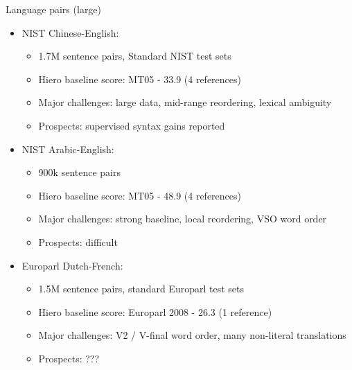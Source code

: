 \documentclass{beamer}
\begin{document}
\begin{frame}[t]{Language pairs (large)}
\begin{itemize}
\item NIST Chinese-English:
  \begin{itemize}
  \item 1.7M sentence pairs, Standard NIST test sets
  \item Hiero baseline score: MT05 - 33.9 (4 references)
  \item Major challenges: large data, mid-range reordering, lexical ambiguity
  \item Prospects: supervised syntax gains reported
  \end{itemize}
\item NIST Arabic-English:
  \begin{itemize}
  \item 900k sentence pairs
  \item Hiero baseline score: MT05 - 48.9 (4 references)
  \item Major challenges: strong baseline, local reordering, VSO word order
  \item Prospects: difficult
  \end{itemize}
\item Europarl Dutch-French:
  \begin{itemize}
  \item 1.5M sentence pairs, standard Europarl test sets
  \item Hiero baseline score: Europarl 2008 - 26.3 (1 reference)
  \item Major challenges: V2 / V-final word order, many non-literal translations
  \item Prospects: ???
  \end{itemize}
\end{itemize}
\end{frame}

\end{document}
